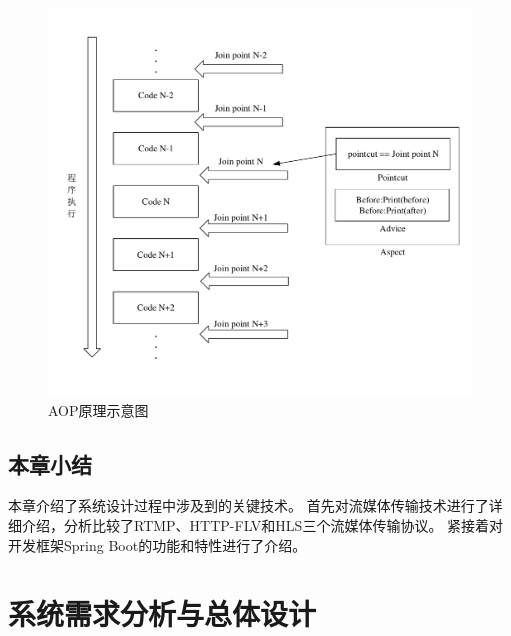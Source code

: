 \begin{figure}[ht]
    \centering   
    \includegraphics[width=1\linewidth]{./Figure/IMG_aop.pdf}
    \caption{AOP原理示意图}\label{Fig:aop}
\end{figure}


\section{本章小结}
本章介绍了系统设计过程中涉及到的关键技术。
首先对流媒体传输技术进行了详细介绍，分析比较了RTMP、HTTP-FLV和HLS三个流媒体传输协议。
紧接着对开发框架Spring Boot的功能和特性进行了介绍。
\chapter{系统需求分析与总体设计}

